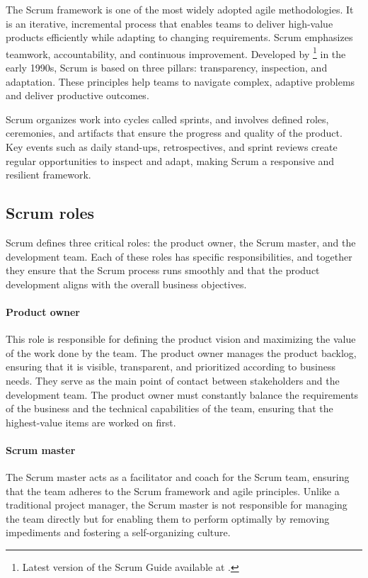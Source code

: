 The Scrum framework is one of the most widely adopted agile methodologies. It is an
iterative, incremental process that enables teams to deliver high-value products
efficiently while adapting to changing requirements. Scrum emphasizes teamwork,
accountability, and continuous improvement. Developed by \textcite{schwaber2020scrum}%
\footnote{Latest version of the Scrum Guide available at .}
in the early 1990s, Scrum is based on three pillars: transparency, inspection, and
adaptation. These principles help teams to navigate complex, adaptive problems and deliver
productive outcomes.

Scrum organizes work into cycles called sprints, and involves defined roles, ceremonies,
and artifacts that ensure the progress and quality of the product. Key events such as
daily stand-ups, retrospectives, and sprint reviews create regular opportunities to inspect
and adapt, making Scrum a responsive and resilient framework.

\subsection{Scrum roles}

Scrum defines three critical roles: the product owner, the Scrum master, and the
development team.
Each of these roles has specific responsibilities, and together they ensure that the Scrum
process runs smoothly and that the product development aligns with the overall business
objectives.

\paragraph{Product owner} This role is responsible for defining the product vision and
    maximizing the value of the work done by the team. The product owner manages the
    product backlog, ensuring that it is visible, transparent, and prioritized according
    to business needs. They serve as the main point of contact between stakeholders and
    the development team. The product owner must constantly
    balance the requirements of the business and the technical capabilities of the team,
    ensuring that the highest-value items are worked on first.

\paragraph{Scrum master} The Scrum master acts as a facilitator and coach for the Scrum team,
    ensuring that the team adheres to the Scrum framework and agile principles. Unlike a
    traditional project manager, the Scrum master is not responsible for managing the team
    directly but for enabling them to perform optimally by removing impediments and
    fostering a self-organizing culture.

